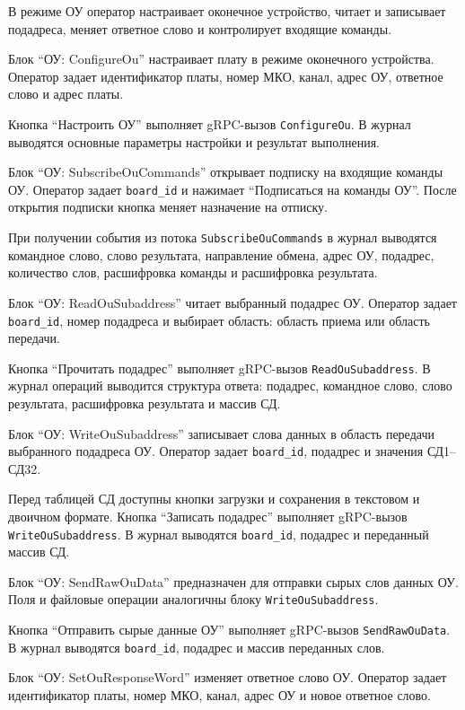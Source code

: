 В режиме ОУ оператор настраивает оконечное устройство, читает и записывает подадреса, меняет ответное слово и контролирует входящие команды.

Блок ``ОУ: ConfigureOu'' настраивает плату в режиме оконечного устройства. Оператор задает идентификатор платы, номер МКО, канал, адрес ОУ, ответное слово и адрес платы.

Кнопка ``Настроить ОУ'' выполняет gRPC-вызов \texttt{ConfigureOu}. В журнал выводятся основные параметры настройки и результат выполнения.

Блок ``ОУ: SubscribeOuCommands'' открывает подписку на входящие команды ОУ. Оператор задает \texttt{board\_id} и нажимает ``Подписаться на команды ОУ''. После открытия подписки кнопка меняет назначение на отписку.

При получении события из потока \texttt{SubscribeOuCommands} в журнал выводятся командное слово, слово результата, направление обмена, адрес ОУ, подадрес, количество слов, расшифровка команды и расшифровка результата.

Блок ``ОУ: ReadOuSubaddress'' читает выбранный подадрес ОУ. Оператор задает \texttt{board\_id}, номер подадреса и выбирает область: область приема или область передачи.

Кнопка ``Прочитать подадрес'' выполняет gRPC-вызов \texttt{ReadOuSubaddress}. В журнал операций выводится структура ответа: подадрес, командное слово, слово результата, расшифровка результата и массив СД.

Блок ``ОУ: WriteOuSubaddress'' записывает слова данных в область передачи выбранного подадреса ОУ. Оператор задает \texttt{board\_id}, подадрес и значения СД1--СД32.

Перед таблицей СД доступны кнопки загрузки и сохранения в текстовом и двоичном формате. Кнопка ``Записать подадрес'' выполняет gRPC-вызов \texttt{WriteOuSubaddress}. В журнал выводятся \texttt{board\_id}, подадрес и переданный массив СД.

Блок ``ОУ: SendRawOuData'' предназначен для отправки сырых слов данных ОУ. Поля и файловые операции аналогичны блоку \texttt{WriteOuSubaddress}.

Кнопка ``Отправить сырые данные ОУ'' выполняет gRPC-вызов \texttt{SendRawOuData}. В журнал выводятся \texttt{board\_id}, подадрес и массив переданных слов.

Блок ``ОУ: SetOuResponseWord'' изменяет ответное слово ОУ. Оператор задает идентификатор платы, номер МКО, канал, адрес ОУ и новое ответное слово.

